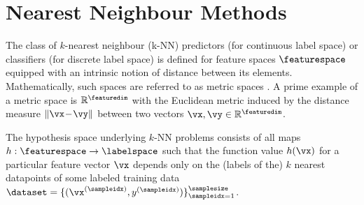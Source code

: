 \documentclass[12pt]{report}
\begin{document}
\section{Nearest Neighbour Methods} 
The class of $k$-nearest neighbour (k-NN) predictors (for continuous label space) or 
classifiers (for discrete label space) is defined for feature spaces $\featurespace$ equipped 
with an intrinsic notion of distance between its elements. Mathematically, such spaces are 
referred to as metric spaces \cite{RudinBookPrinciplesMatheAnalysis}. A prime example of a 
metric space is $\mathbb{R}^{\featuredim}$ with the Euclidean metric induced by the distance 
measure $\| \vx\!-\!\vy \|$ between two vectors $\vx, \vy \in \mathbb{R}^{\featuredim}$. 

The hypothesis space underlying $k$-NN problems consists of all maps $h: \featurespace \rightarrow \labelspace$ 
such that the function value $h(\vx)$ for a particular feature vector $\vx$ depends only on the (labels of the) $k$ 
nearest datapoints of some labeled training data $\dataset = \{ (\vx^{(\sampleidx)},y^{(\sampleidx)}) \}_{\sampleidx=1}^{\samplesize}$. 
\end{document}
